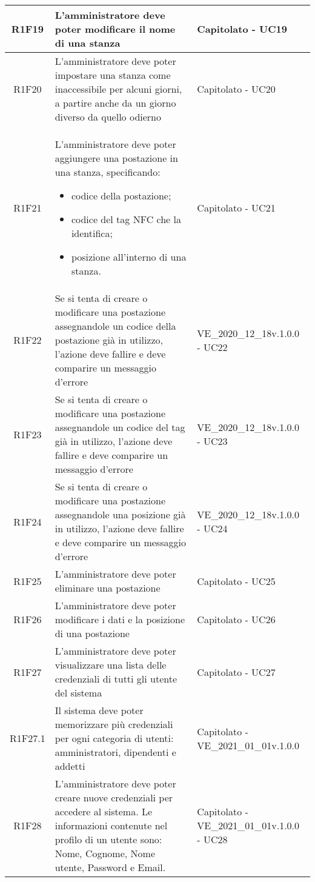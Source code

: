 \begin{center}
\begin{longtable}{|c|p{10cm}|p{4cm}|}
		\hline
		R1F19&L'amministratore deve poter modificare il nome di una stanza	& Capitolato - UC19	\\
		\hline
		R1F20&L'amministratore deve poter impostare una stanza come inaccessibile per alcuni giorni, a partire anche da un giorno diverso da quello odierno	& Capitolato - UC20	\\
		\hline
		R1F21&L'amministratore deve poter aggiungere una postazione in una stanza, specificando:
		\begin{itemize}
			\item codice della postazione;
			\item codice del tag NFC che la identifica;
			\item posizione all'interno di una stanza.
		\end{itemize} & Capitolato - UC21	\\
		\hline
		R1F22&	Se si tenta di creare o modificare una postazione assegnandole un codice della postazione già in utilizzo, l'azione deve fallire e deve comparire un messaggio d'errore& VE\_2020\_12\_18v.1.0.0 - UC22 	\\
		\hline
		R1F23&Se si tenta di creare o modificare una postazione assegnandole un codice del tag già in utilizzo, l'azione deve fallire e deve comparire un messaggio d'errore	&VE\_2020\_12\_18v.1.0.0 - UC23 	\\
		\hline
		R1F24&Se si tenta di creare o modificare una postazione assegnandole una posizione già in utilizzo, l'azione deve fallire e deve comparire un messaggio d'errore	&VE\_2020\_12\_18v.1.0.0 - UC24 	\\
		\hline
		R1F25&L'amministratore deve poter eliminare una postazione	& Capitolato - UC25	\\
		\hline
		R1F26&L'amministratore deve poter modificare i dati e la posizione di una postazione	& Capitolato - UC26	\\
		\hline
		R1F27&L'amministratore deve poter visualizzare una lista delle credenziali di tutti gli utente del sistema	& Capitolato - UC27	\\
		\hline
		R1F27.1&Il sistema deve poter memorizzare più credenziali per ogni categoria di utenti: amministratori, dipendenti e addetti	& Capitolato - VE\_2021\_01\_01v.1.0.0	\\
		\hline
		R1F28&L'amministratore deve poter creare nuove credenziali per accedere al sistema. Le informazioni contenute nel profilo di un utente sono: Nome, Cognome, Nome utente, Password e Email.	& Capitolato - VE\_2021\_01\_01v.1.0.0 - UC28	\\

\end{longtable}
\end{center}
